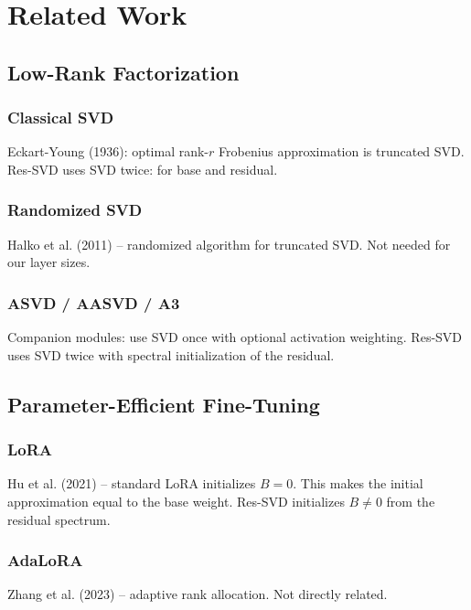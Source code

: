 \section{Related Work}

\subsection{Low-Rank Factorization}

\subsubsection{Classical SVD}

Eckart-Young (1936): optimal rank-$r$ Frobenius approximation is truncated SVD. 
Res-SVD uses SVD twice: for base and residual.

\subsubsection{Randomized SVD}

Halko et al. (2011) -- randomized algorithm for truncated SVD. Not needed 
for our layer sizes.

\subsubsection{ASVD / AASVD / A3}

Companion modules: use SVD once with optional activation weighting. Res-SVD 
uses SVD twice with spectral initialization of the residual.

\subsection{Parameter-Efficient Fine-Tuning}

\subsubsection{LoRA}

Hu et al. (2021) -- standard LoRA initializes $B = 0$. This makes the 
initial approximation equal to the base weight. Res-SVD initializes 
$B \neq 0$ from the residual spectrum.

\subsubsection{AdaLoRA}

Zhang et al. (2023) -- adaptive rank allocation. Not directly related.

